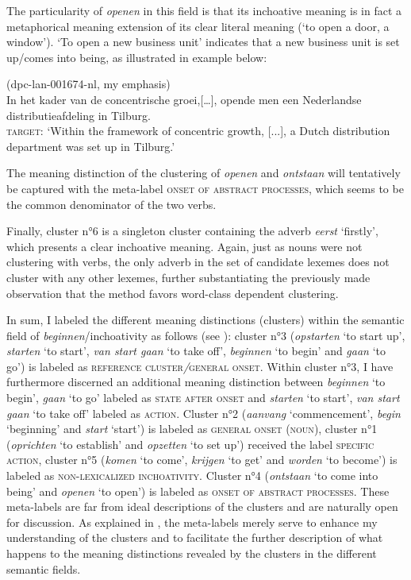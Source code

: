 The particularity of \textit{openen} in this field is that its inchoative meaning is in fact a metaphorical meaning extension of its clear literal meaning (`to open a door, a window'). `To open a new business unit' indicates that a new business unit is set up\slash comes into being, as illustrated in example  below:

\ea\label{ex:14}(dpc-lan-001674-nl, my emphasis)\\
In het kader van de concentrische groei,[…], opende men een Nederlandse distributieafdeling in Tilburg.\\\relax
\textsc{target:} `Within the framework of concentric growth, [...], a Dutch distribution department was set up in Tilburg.'
\z

The meaning distinction of the clustering of \textit{openen} and \textit{ontstaan} will tentatively be captured with the meta-label \textsc{onset of abstract processes}, which seems to be the common denominator of the two verbs.

Finally, cluster n°6 is a singleton cluster containing the adverb \textit{eerst} `firstly', which presents a clear inchoative meaning. Again, just as nouns were not clustering with verbs, the only adverb in the set of candidate lexemes does not cluster with any other lexemes, further substantiating the previously made observation that the method favors word-class dependent clustering.

In sum, I labeled the different meaning distinctions (clusters) within the semantic field of \textit{beginnen}/inchoativity as follows (see ): cluster n°3 (\textit{opstarten} `to start up', \textit{starten} `to start', \textit{van start gaan} `to take off', \textit{beginnen} `to begin' and \textit{gaan} `to go') is labeled as \textsc{reference cluster}\textit{/}\textsc{general onset}. Within cluster n°3, I have furthermore discerned an additional meaning distinction between \textit{beginnen} `to begin', \textit{gaan} `to go' labeled as \textsc{state after onset} and \textit{starten} `to start', \textit{van start gaan} `to take off' labeled as \textsc{action}. Cluster n°2 (\textit{aanvang} `commencement', \textit{begin} `beginning' and \textit{start} `start') is labeled as \textsc{general onset} (\textsc{noun}), cluster n°1 (\textit{oprichten} `to establish' and \textit{opzetten} `to set up') received the label {\textsc{specific}} \textsc{action}, cluster n°5 (\textit{komen} `to come', \textit{krijgen} `to get' and \textit{worden} `to become') is labeled as {\textsc{non-lexicalized inchoativity}}. Cluster n°4 (\textit{ontstaan} `to come into being' and \textit{openen} `to open') is labeled as {\textsc{onset of abstract processes}}. These meta-labels are far from ideal descriptions of the clusters and are naturally open for discussion. As explained in , the meta-labels merely serve to enhance my understanding of the clusters and to facilitate the further description of what happens to the meaning distinctions revealed by the clusters in the different semantic fields.

